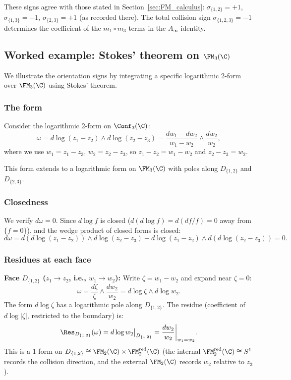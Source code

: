 \begin{remark}
These signs agree with those stated in Section~\ref{sec:FM_calculus}: $\sigma_{\{1,2\}} = +1$, $\sigma_{\{1,3\}} = -1$, $\sigma_{\{2,3\}} = +1$ (as recorded there). The total collision sign $\sigma_{\{1,2,3\}} = -1$ determines the coefficient of the $m_1 \circ m_3$ terms in the $A_\infty$ identity.
\end{remark}

\subsection{Worked example: Stokes' theorem on $\FM_3(\C)$}
\label{subsec:stokes-FM3}

We illustrate the orientation signs by integrating a specific logarithmic 2-form over $\FM_3(\C)$ using Stokes' theorem.

\subsubsection{The form}

Consider the logarithmic 2-form on $\Conf_3(\C)$:
\begin{equation}
\label{eq:stokes-example-form}
\omega = d\log(z_1 - z_2)\wedge d\log(z_2 - z_3) = \frac{dw_1 - dw_2}{w_1 - w_2}\wedge \frac{dw_2}{w_2},
\end{equation}
where we use $w_1 = z_1 - z_3$, $w_2 = z_2 - z_3$, so $z_1 - z_2 = w_1 - w_2$ and $z_2 - z_3 = w_2$.

This form extends to a logarithmic form on $\FM_3(\C)$ with poles along $D_{\{1,2\}}$ and $D_{\{2,3\}}$.

\subsubsection{Closedness}

We verify $d\omega = 0$. Since $d\log f$ is closed ($d(d\log f) = d(df/f) = 0$ away from $\{f=0\}$), and the wedge product of closed forms is closed:
\[
d\omega = d(d\log(z_1-z_2))\wedge d\log(z_2-z_3) - d\log(z_1-z_2)\wedge d(d\log(z_2-z_3)) = 0.
\]

\subsubsection{Residues at each face}

\textbf{Face $D_{\{1,2\}}$ ($z_1\to z_2$, i.e., $w_1\to w_2$):}
Write $\zeta = w_1 - w_2$ and expand near $\zeta = 0$:
\[
\omega = \frac{d\zeta}{\zeta}\wedge\frac{dw_2}{w_2} = d\log\zeta\wedge d\log w_2.
\]
The form $d\log\zeta$ has a logarithmic pole along $D_{\{1,2\}}$. The residue (coefficient of $d\log|\zeta|$, restricted to the boundary) is:
\[
\Res_{D_{\{1,2\}}}(\omega) = d\log w_2\big|_{D_{\{1,2\}}} = \frac{dw_2}{w_2}\bigg|_{w_1=w_2}.
\]
This is a 1-form on $D_{\{1,2\}} \cong \FM_2(\C)\times\FM_2^{\mathrm{red}}(\C)$ (the internal $\FM_2^{\mathrm{red}}(\C) \cong S^1$ records the collision direction, and the external $\FM_2(\C)$ records $w_2$ relative to $z_3$).

